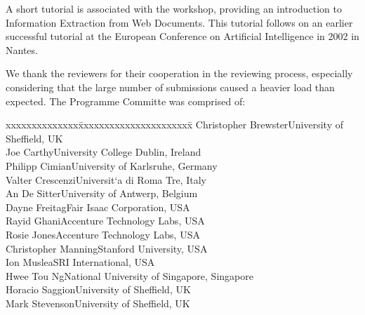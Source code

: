 \documentclass[12pt,a4paper]{article}
\begin{document}
\begin{small}
A short tutorial is associated with the workshop, providing an
introduction to Information Extraction from Web Documents.  This
tutorial follows on an earlier successful tutorial at the European
Conference on Artificial Intelligence in 2002 in Nantes.

We thank the reviewers for their cooperation in the reviewing process,
especially considering that the large number of submissions caused a
heavier load than expected.  The Programme Committe was comprised of:

\begin{center}
\begin{tabbing}
xxxxxxxxxxxxxx\=xxxxxxxxxxxxxxxxxxxxxx\=\kill
\>Christopher Brewster\>University of Sheffield, UK \\
\>Joe Carthy\>University College Dublin, Ireland \\
\>Philipp Cimian\>University of Karlsruhe, Germany \\
\>Valter Crescenzi\>Universit\a`{a} di Roma Tre, Italy \\
\>An De Sitter\>University of Antwerp, Belgium \\
\>Dayne Freitag\>Fair Isaac Corporation, USA \\
\>Rayid Ghani\>Accenture Technology Labs, USA \\
\>Rosie Jones\>Accenture Technology Labs, USA \\
\>Christopher Manning\>Stanford University, USA \\
\>Ion Muslea\>SRI International, USA \\
\>Hwee Tou Ng\>National University of Singapore, Singapore \\
\>Horacio Saggion\>University of Sheffield, UK \\
\>Mark Stevenson\>University of Sheffield, UK
\end{tabbing}
\end{center}

\end{small}

\newpage
\end{document}
